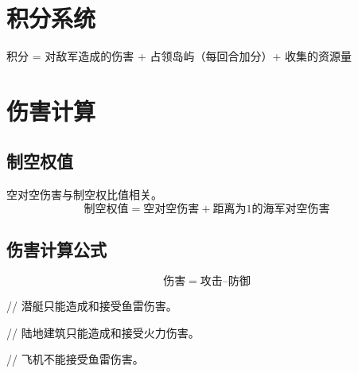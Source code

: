 \documentclass[11pt,a4paper]{article}
\begin{document}
  \section{积分系统}
  \label{sec:积分系统}
    积分 = 对敌军造成的伤害 + 占领岛屿（每回合加分）+ 收集的资源量


  \section{伤害计算}
    \subsection{制空权值}
      空对空伤害与制空权比值相关。
      \begin{equation}
        \text{制空权值} = \text{空对空伤害} + \text{距离为1的海军对空伤害}
      \end{equation}

    \subsection{伤害计算公式}
      \begin{equation}
        \text{伤害} = \text{攻击} – \text{防御}
      \end{equation}


    // 潜艇只能造成和接受鱼雷伤害。

    // 陆地建筑只能造成和接受火力伤害。

    // 飞机不能接受鱼雷伤害。
\end{document}
